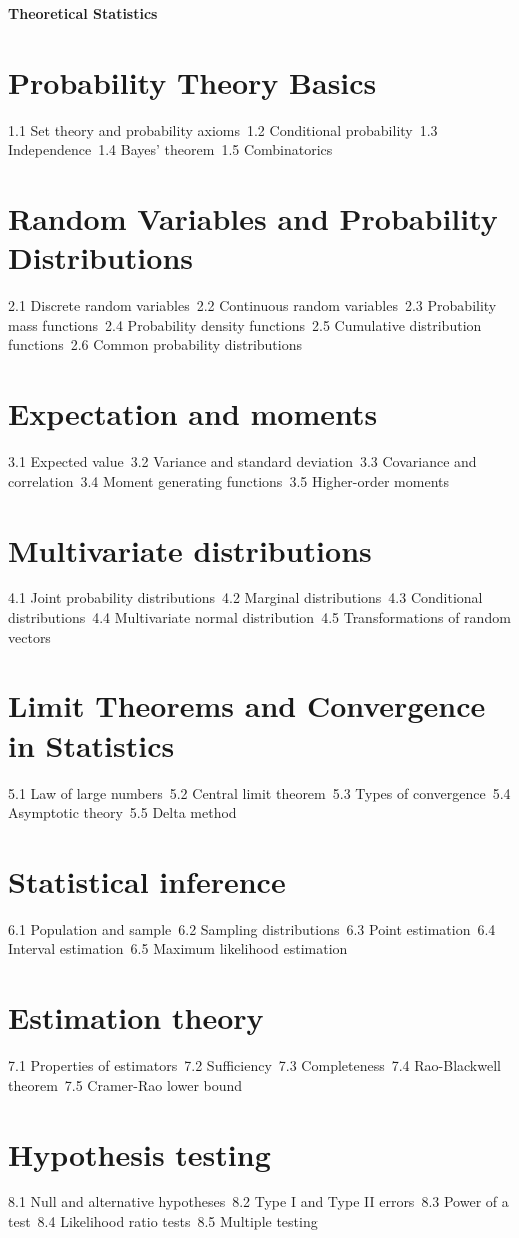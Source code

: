 {\LARGE \bf{Theoretical Statistics}}
\section{Probability Theory Basics}
1.1 Set theory and probability axioms\
1.2 Conditional probability\
1.3 Independence\
1.4 Bayes' theorem\
1.5 Combinatorics\
\section{Random Variables and Probability Distributions}
2.1 Discrete random variables\
2.2 Continuous random variables\
2.3 Probability mass functions\
2.4 Probability density functions\
2.5 Cumulative distribution functions\
2.6 Common probability distributions\
\section{Expectation and moments}
3.1 Expected value\
3.2 Variance and standard deviation\
3.3 Covariance and correlation\
3.4 Moment generating functions\
3.5 Higher-order moments\
\section{Multivariate distributions}
4.1 Joint probability distributions\
4.2 Marginal distributions\
4.3 Conditional distributions\
4.4 Multivariate normal distribution\
4.5 Transformations of random vectors\
\section{Limit Theorems and Convergence in Statistics}
5.1 Law of large numbers\
5.2 Central limit theorem\
5.3 Types of convergence\
5.4 Asymptotic theory\
5.5 Delta method\
\section{Statistical inference}
6.1 Population and sample\
6.2 Sampling distributions\
6.3 Point estimation\
6.4 Interval estimation\
6.5 Maximum likelihood estimation\
\section{Estimation theory}
7.1 Properties of estimators\
7.2 Sufficiency\
7.3 Completeness\
7.4 Rao-Blackwell theorem\
7.5 Cramer-Rao lower bound\
\section{Hypothesis testing}
8.1 Null and alternative hypotheses\
8.2 Type I and Type II errors\
8.3 Power of a test\
8.4 Likelihood ratio tests\
8.5 Multiple testing\
